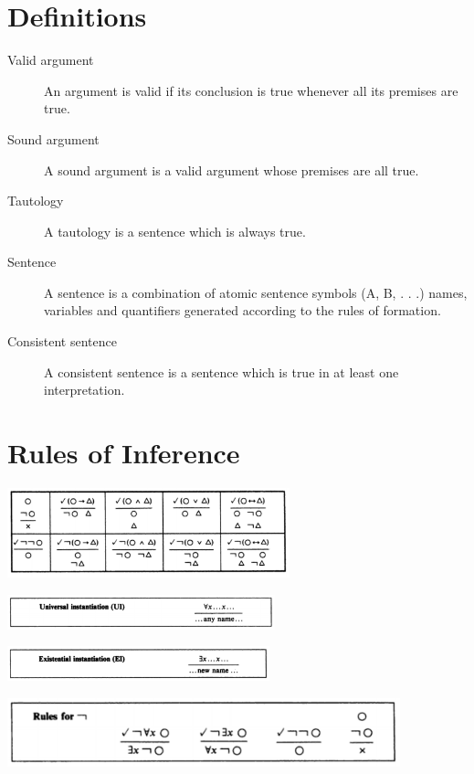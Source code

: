 \documentclass[12pt]{article}
\begin{document}
\section*{Definitions}
\begin{description}
  \item[Valid argument] An argument is valid if its conclusion is true whenever all its premises are true.
  \item[Sound argument] A sound argument is a valid argument whose premises are all true.
  \item[Tautology] A tautology is a sentence which is always true.
  \item[Sentence] A sentence is a combination of atomic sentence symbols (A, B, . . .) names, variables and quantifiers generated according to the rules of formation.
  \item[Consistent sentence] A consistent sentence is a sentence which is true in at least one interpretation.
\end{description}

\section*{Rules of Inference}
\begin{multicols}{2}
  \includegraphics[height=2.6cm]{rules.png}\par
  \includegraphics[height=1cm]{ui.png}\par
  \includegraphics[height=1cm]{ei.png}\par
\end{multicols}
\begin{center}
  \includegraphics[height=2cm]{not_ui_ei.png}
\end{center}
\end{document}
